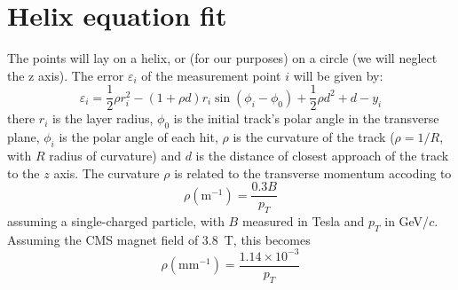 \documentclass[10pt,a4paper]{article}
\begin{document}
\section{Helix equation fit}
The points will lay on a helix, or (for our purposes) on a circle (we
will neglect the z axis).  The error $\varepsilon_i$ of the
measurement point $i$ will be given by:
\begin{equation}
  \label{eq:helix}
  \varepsilon_i = \frac 1 2 \rho r_i^2 - (1 + \rho d) r_i \sin(\phi_i-\phi_0) + \frac 1 2 \rho d^2 + d -y_i
\end{equation}
there $r_i$ is the layer radius, $\phi_0$ is the initial track's polar
angle in the transverse plane, $\phi_i$ is the polar angle of each
hit, $\rho$ is the curvature of the track ($\rho=1/R$, with $R$ radius
of curvature) and $d$ is the distance of closest approach of the track
to the $z$ axis.  The curvature $\rho$ is related to the transverse
momentum accoding to
\begin{equation}
  \rho (\mathrm{m^{-1}}) = \frac {0.3 B} {p_T} 
\end{equation}
assuming a single-charged particle, with $B$ measured in Tesla and
$p_T$ in GeV/$c$. Assuming the CMS magnet field of 3.8~T, this becomes
\begin{equation}
  \rho (\mathrm{mm^{-1}}) = \frac {1.14\times 10^{-3}} {p_T}
\end{equation}
\end{document}
